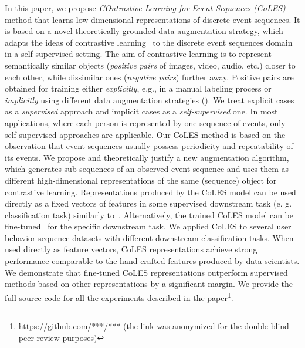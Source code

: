 \documentclass{article}
\begin{document}
In this paper, we propose \emph{COntrastive Learning for Event Sequences (CoLES)} method that learns low-dimensional representations of discrete event sequences. It is based on a novel theoretically grounded data augmentation strategy, which adapts the ideas of contrastive learning~\citep{Xing2002DistanceML, Hadsell2006DimensionalityRB} to the discrete event sequences domain in a self-supervised setting.
The aim of contrastive learning is to represent semantically similar objects (\textit{positive pairs} of images, video, audio, etc.) closer to each other, while dissimilar ones (\textit{negative pairs}) further away. Positive pairs are obtained for training either {\it explicitly}, e.g., in a manual labeling process or {\it implicitly} using different data augmentation strategies (\cite{Falcon2020AFF}). We treat explicit cases as a {\it supervised} approach and implicit cases as a {\it self-supervised} one. In most applications, where each person is represented by one sequence of events, only self-supervised approaches are applicable. Our CoLES method is based on the observation that event sequences usually possess periodicity and repeatability of its events. We propose and theoretically justify a new augmentation algorithm, which generates sub-sequences of an observed event sequence and uses them as different high-dimensional representations of the same (sequence) object for contrastive learning.
Representations produced by the CoLES model can be used directly as a fixed vectors of features in some supervised downstream task (e. g. classification task) similarly to~\citep{Mikolov2013EfficientEO, Song2017LearningUE, Zhai2019LearningAU}. Alternatively, the trained CoLES model can be fine-tuned~\citep{Devlin2019BERTPO} for the specific downstream task.
We applied CoLES to several user behavior sequence datasets with different downstream classification tasks. When used directly as feature vectors, CoLES representations achieve strong performance comparable to the hand-crafted features produced by data scientists.
We demonstrate that fine-tuned CoLES representations outperform supervised methods based on other representations by a significant margin. %
We provide the full source code for all the experiments described in the paper\footnote{https://github.com/***/*** (the link was anonymized for the double-blind peer review purposes)}.
\end{document}
